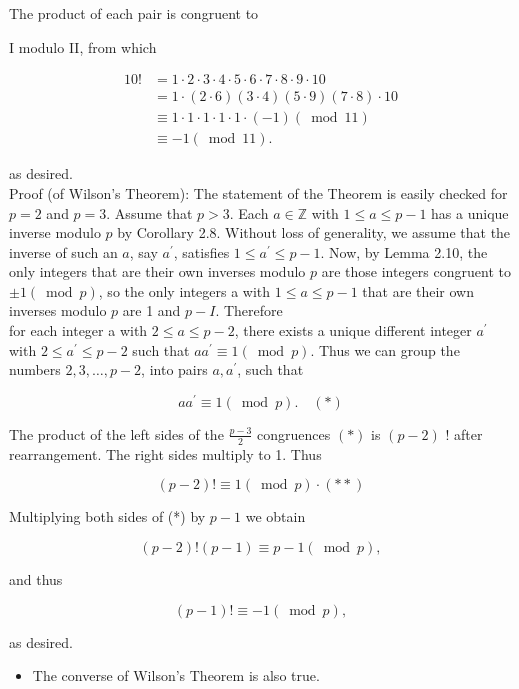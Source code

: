 \documentclass[10pt]{article}
\begin{document}
The product of each pair is congruent to

I modulo II, from which

$$
\begin{aligned}
10! & =1 \cdot 2 \cdot 3 \cdot 4 \cdot 5 \cdot 6 \cdot 7 \cdot 8 \cdot 9 \cdot 10 \\
& =1 \cdot(2 \cdot 6)(3 \cdot 4)(5 \cdot 9)(7 \cdot 8) \cdot 10 \\
& \equiv 1 \cdot 1 \cdot 1 \cdot 1 \cdot 1 \cdot(-1)(\bmod 11) \\
& \equiv-1(\bmod 11) .
\end{aligned}
$$

as desired.\\
Proof (of Wilson's Theorem): The statement of the Theorem is easily checked for $p=2$ and $p=3$. Assume that $p>3$. Each $a \in \mathbb{Z}$ with $1 \leqslant a \leqslant p-1$ has a unique inverse modulo $p$ by Corollary 2.8. Without loss of generality, we assume that the inverse of such an $a$, say $a^{\prime}$, satisfies $1 \leqslant a^{\prime} \leqslant p-1$. Now, by Lemma 2.10, the only integers that are their own inverses modulo $p$ are those integers congruent to $\pm 1(\bmod p)$, so the only integers a with $1 \leq a \leq p-1$ that are their own inverses modulo $p$ are 1 and $p-I$. Therefore\\
for each integer a with $2 \leqslant a \leqslant p-2$, there exists a unique different integer $a^{\prime}$ with $2 \leqslant a^{\prime} \leqslant p-2$ such that $a a^{\prime} \equiv 1(\bmod p)$. Thus we can group the numbers $2,3, \ldots, p-2$, into pairs $a, a^{\prime}$, such that

$$
a a^{\prime} \equiv 1(\bmod p) . \quad(*)
$$

The product of the left sides of the $\frac{p-3}{2}$ congruences $(*)$ is $(p-2)$ ! after rearrangement. The right sides multiply to 1. Thus

$$
(p-2)!\equiv 1(\bmod p) \cdot(* *)
$$

Multiplying both sides of (*) by $p-1$ we obtain

$$
(p-2)!(p-1) \equiv p-1(\bmod p),
$$

and thus

$$
(p-1)!\equiv-1(\bmod p),
$$

as desired.

\begin{itemize}
  \item The converse of Wilson's Theorem is also true.
\end{itemize}
\end{document}
